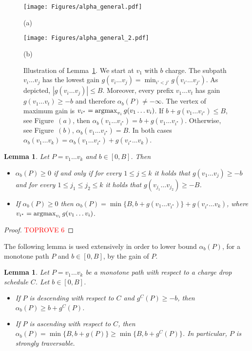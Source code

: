 \documentclass[11pt]{article}
\newtheorem{lemma}[theorem]{Lemma}
\newcommand{\argmax}{\operatornamewithlimits{argmax}}
\begin{document}
\begin{figure}
    \centering
\texttt{[image: Figures/alpha\_general.pdf]}
    \par\smallskip (a)
    
    \vspace{0.5cm} 

\texttt{[image: Figures/alpha\_general\_2.pdf]}
    \par\smallskip (b)
\caption{Illustration of Lemma~\ref{lem:alpha_general}. We start at $v_1$ with $b$ charge. The subpath $v_i\ldots v_j$ has the lowest gain $g(v_i\ldots v_j) = \min_{i'<j'} g(v_{i'}\ldots v_{j'})$. As depicted, $|g(v_i\ldots v_j)|\le B$. Moreover, every prefix $v_1\ldots v_t$ has gain $g(v_1\ldots v_t)\ge -b$ and therefore $
\alpha_b(P)\neq -\infty$. The vertex of maximum gain is $v_{i^\star} = \argmax_{v_i} g(v_1\ldots v_i)$. If $b+g(v_1\ldots v_{i^\star})\le B$, see Figure~$(a)$, then $\alpha_b(v_1\ldots v_{i^\star}) = b + g(v_1\ldots v_{i^\star})$. Otherwise, see Figure~$(b)$, $\alpha_b(v_1\ldots v_{i^\star}) = B$. In both cases $\alpha_b(v_1\ldots v_{k}) = \alpha_b(v_1\ldots v_{i^\star}) + g( v_{i^\star} \ldots v_k)$.}  
\label{fig:alpha_general}
\end{figure}

\begin{lemma}\label{lem:alpha_general}
 Let $P = v_1\ldots v_k$ and $b\in [0,B]$. Then
 \begin{itemize}
     \item $\alpha_b(P) \ge 0 $ if and only if for every $1\le j \le k$ it holds that $g(v_1\ldots v_{j})\ge -b$ and for every $1\le j_1 \le j_2 \le k$ it holds that $g(v_{j_1}\ldots v_{j_2})\ge -B$.
     \item If $\alpha_b(P) \ge 0 $ then $\alpha_b(P) =  \min \{B, b + g(v_1\ldots v_{i^\star}) \} + g(v_{i^\star} \ldots v_k)$, where $v_{i^\star} = \argmax_{v_i}g(v_1\ldots v_i)$. 
 \end{itemize}
\end{lemma}

\begin{proof}\textcolor{red}{TOPROVE 6}\end{proof}


The following lemma is used extensively in order to lower bound $\alpha_b(P)$, for a monotone path $P$ and $b\in [0,B]$, by the gain of $P$. 

\begin{lemma}\label{lemma:alpha-of-monotone}
    Let $P=v_1\ldots v_k$ be a monotone path with respect to a charge drop schedule $C$. Let $b\in [0,B]$.
    \begin{itemize}
        \item If $P$ is descending with respect to $C$ and $g^C(P)\ge -b$, then   $\alpha_b(P) \ge b+g^C(P)$.  
        \item If $P$ is ascending with respect to $C$, then  $\alpha_b(P) = \min\{B,b+g(P)\} \ge \min\{B,b+g^C(P)\}$. In particular, $P$ is strongly traversable.
    \end{itemize}
\end{lemma}
\end{document}
